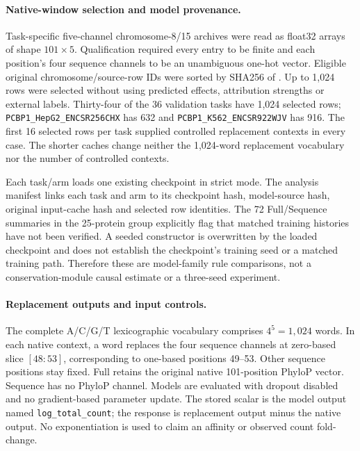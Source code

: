 \documentclass[11pt]{article}
\begin{document}
\paragraph{Native-window selection and model provenance.}
Task-specific five-channel chromosome-8/15 archives were read as float32 arrays of shape \(101\times5\). Qualification required every entry to be finite and each position's four sequence channels to be an unambiguous one-hot vector. Eligible original chromosome/source-row IDs were sorted by SHA256 of . Up to 1,024 rows were selected without using predicted effects, attribution strengths or external labels. Thirty-four of the 36 validation tasks have 1,024 selected rows; \texttt{PCBP1\_HepG2\_ENCSR256CHX} has 632 and \texttt{PCBP1\_K562\_ENCSR922WJV} has 916. The first 16 selected rows per task supplied controlled replacement contexts in every case. The shorter caches change neither the 1,024-word replacement vocabulary nor the number of controlled contexts.

Each task/arm loads one existing checkpoint in strict mode. The analysis manifest links each task and arm to its checkpoint hash, model-source hash, original input-cache hash and selected row identities. The 72 Full/Sequence summaries in the 25-protein group explicitly flag that matched training histories have not been verified. A seeded constructor is overwritten by the loaded checkpoint and does not establish the checkpoint's training seed or a matched training path. Therefore these are model-family rule comparisons, not a conservation-module causal estimate or a three-seed experiment.

\paragraph{Replacement outputs and input controls.}
The complete A/C/G/T lexicographic vocabulary comprises \(4^5=1,024\) words. In each native context, a word replaces the four sequence channels at zero-based slice \([48:53]\), corresponding to one-based positions 49--53. Other sequence positions stay fixed. Full retains the original native 101-position PhyloP vector. Sequence has no PhyloP channel. Models are evaluated with dropout disabled and no gradient-based parameter update. The stored scalar is the model output named \texttt{log\_total\_count}; the response is replacement output minus the native output. No exponentiation is used to claim an affinity or observed count fold-change.
\end{document}
